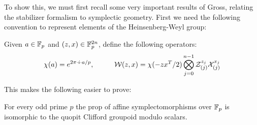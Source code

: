 To show this, we must first recall some very important results of Gross, relating the stabilizer formalism to symplectic geometry.  First we need the following convention to represent elements of the Heinsenberg-Weyl group:
\begin{definition}
Given $a \in \mathbb{F}_p$ and $(z,x )\in \mathbb{F}_p^{2n}$, define the following operators:
$$
\chi(a) = e^{2\pi\cdot i \cdot a/p}, \hspace*{1cm} {\mathcal W}(z,x)=\chi(-zx^T/2)\bigotimes_{j=0}^{n-1}\mathcal{Z}_{(j)}^{z_j}\mathcal{X}_{(j)}^{x_j}
$$
\end{definition}
This makes the following easier to prove:
\begingroup\allowdisplaybreaks
\begin{lemma}
For every odd prime $p$ the prop  of affine symplectomorphisms over  $\mathbb{F}_p$ is isomorphic to the quopit Clifford groupoid modulo scalars.
\end{lemma}
